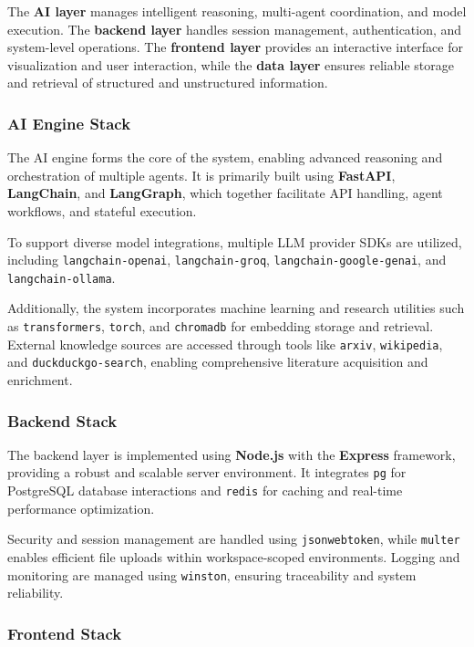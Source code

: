 \documentclass[12pt, a4paper]{article}
\begin{document}
The \textbf{AI layer} manages intelligent reasoning, multi-agent coordination, and model execution. The \textbf{backend layer} handles session management, authentication, and system-level operations. The \textbf{frontend layer} provides an interactive interface for visualization and user interaction, while the \textbf{data layer} ensures reliable storage and retrieval of structured and unstructured information.

\subsubsection*{AI Engine Stack}

The AI engine forms the core of the system, enabling advanced reasoning and orchestration of multiple agents. It is primarily built using \textbf{FastAPI}, \textbf{LangChain}, and \textbf{LangGraph}, which together facilitate API handling, agent workflows, and stateful execution.

To support diverse model integrations, multiple LLM provider SDKs are utilized, including \texttt{langchain-openai}, \texttt{langchain-groq}, \texttt{langchain-google-genai}, and \texttt{langchain-ollama}. 

Additionally, the system incorporates machine learning and research utilities such as \texttt{transformers}, \texttt{torch}, and \texttt{chromadb} for embedding storage and retrieval. External knowledge sources are accessed through tools like \texttt{arxiv}, \texttt{wikipedia}, and \texttt{duckduckgo-search}, enabling comprehensive literature acquisition and enrichment.

\subsubsection*{Backend Stack}

The backend layer is implemented using \textbf{Node.js} with the \textbf{Express} framework, providing a robust and scalable server environment. It integrates \texttt{pg} for PostgreSQL database interactions and \texttt{redis} for caching and real-time performance optimization.

Security and session management are handled using \texttt{jsonwebtoken}, while \texttt{multer} enables efficient file uploads within workspace-scoped environments. Logging and monitoring are managed using \texttt{winston}, ensuring traceability and system reliability.

\subsubsection*{Frontend Stack}
\end{document}
